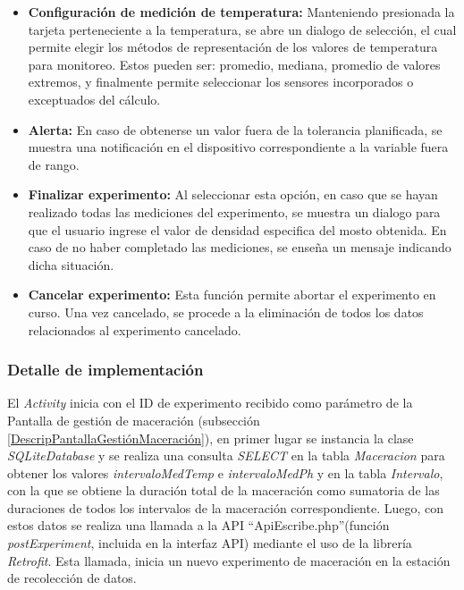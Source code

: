                 \begin{itemize}
                    \item \textbf {Configuración de medición de temperatura:} Manteniendo presionada la tarjeta perteneciente a la temperatura, se abre un dialogo de selección, el cual permite elegir los métodos de representación de los valores de temperatura para monitoreo. Estos pueden ser: promedio, mediana, promedio de valores extremos, y finalmente permite seleccionar los sensores incorporados o exceptuados del cálculo.
                    
                    \item \textbf{Alerta:} En caso de obtenerse un valor fuera de la tolerancia planificada, se muestra una notificación en el dispositivo correspondiente a la variable fuera de rango. 
                    
                    \item \textbf{Finalizar experimento:} Al seleccionar esta opción, en caso que se hayan realizado todas las mediciones del experimento, se muestra un dialogo para que el usuario ingrese el valor de densidad especifica del mosto obtenida. En caso de no haber completado las mediciones, se enseña un mensaje indicando dicha situación.
            
                    \item \textbf{Cancelar experimento:} Esta función permite abortar el experimento en curso. Una vez cancelado, se procede a la eliminación de todos los datos relacionados al experimento cancelado.
                \end{itemize}
            
            \subsubsection{Detalle de implementación}
             \par El \textit{Activity} inicia con el ID de experimento recibido como parámetro de la Pantalla de gestión de maceración (subsección \ref{DescripPantallaGestiónMaceración}), en primer lugar se instancia la clase \textit{SQLiteDatabase} y se realiza una consulta \textit{SELECT} en la tabla \textit{Maceracion} para obtener los valores \textit{intervaloMedTemp} e \textit{intervaloMedPh} y en la tabla \textit{Intervalo}, con la que se obtiene la duración total de la maceración como sumatoria de las duraciones de todos los intervalos de la maceración correspondiente. Luego, con estos datos se realiza una llamada a la API ``ApiEscribe.php''(función \textit{postExperiment}, incluida en la interfaz API) mediante el uso de la librería \textit{Retrofit}. Esta llamada, inicia un nuevo experimento de maceración en la estación de recolección de datos.
             
